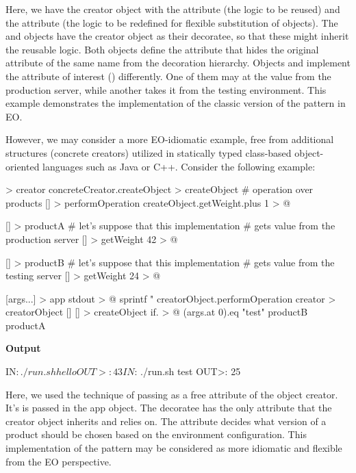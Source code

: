 \documentclass[12pt]{book}
\begin{document}
{{Here, we have the creator object with the  attribute (the logic to be reused) and the  attribute (the logic to be redefined for flexible substitution of objects). The  and  objects have the creator object as their decoratee, so that these might inherit the reusable logic. Both objects define the  attribute that hides the original attribute of the same name from the decoration hierarchy. Objects  and  implement the attribute of interest () differently. One of them may at the value from the production server, while another takes it from the testing environment. This example demonstrates the implementation of the classic version of the pattern in EO.

However, we may consider a more EO-idiomatic example, free from additional structures (concrete creators) utilized in statically typed class-based object-oriented languages such as Java or C++. Consider the following example:

\begin{ffcode}
[concreteCreator] > creator
  concreteCreator.createObject > createObject
  # operation over products
  [] > performOperation
    createObject.getWeight.plus 1 > @

[] > productA
  # let's suppose that this implementation
  # gets value from the production server
  [] > getWeight
    42 > @

[] > productB
  # let's suppose that this implementation
  # gets value from the testing server
  [] > getWeight
    24 > @

[args...] > app
  stdout > @
    sprintf
      "%
      creatorObject.performOperation
  creator > creatorObject
    []
      [] > createObject
        if. > @
          (args.at 0).eq "test"
          productB
          productA

\end{ffcode}
\textbf{Output}
\begin{ffcode}
IN$: ./run.sh hello
OUT>: 43
IN$: ./run.sh test
OUT>: 25
\end{ffcode}

Here, we used the technique of passing  as a free attribute of the object creator. It's  is passed in the app object. The decoratee has the only attribute  that the creator object inherits and relies on. The  attribute decides what version of a product should be chosen based on the environment configuration. This implementation of the pattern may be considered as more idiomatic and flexible from the EO perspective.


}}
\end{document}

